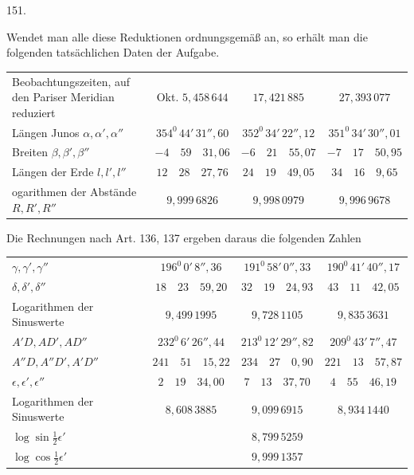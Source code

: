 \par{}\medskip
\hypertarget{native-202-article151}{}
\begin{center}151.\end{center}
Wendet man alle diese Reduktionen ordnungsgemäß an, so erhält man die folgenden tatsächlichen Daten der Aufgabe.
\begin{center}
\footnotesize\setlength{\tabcolsep}{3pt}\renewcommand{\arraystretch}{1.3}
\begin{tabular}{@{}p{12em}|c|c|c@{}}
{\raggedright Beobachtungszeiten, auf den Pariser Meridian reduziert\par} & Okt. $5{,}458\,644$ & $17{,}421\,885$ & $27{,}393\,077$\\
{\raggedright Längen Junos $\alpha,\alpha',\alpha''$\par} & $354^0\,44'\,31''{,}60$ & $352^0\,34'\,22''{,}12$ & $351^0\,34'\,30''{,}01$\\
{\raggedright Breiten $\beta,\beta',\beta''$\par} & $-4\quad59\quad31{,}06$ & $-6\quad21\quad55{,}07$ & $-7\quad17\quad50{,}95$\\
{\raggedright Längen der Erde $l,l',l''$\par} & $12\quad28\quad27{,}76$ & $24\quad19\quad49{,}05$ & $34\quad16\quad9{,}65$\\
{\raggedright ogarithmen der Abstände $R,R',R''$\par} & $9{,}999\,6826$ & $9{,}998\,0979$ & $9{,}996\,9678$\\
\end{tabular}
\end{center}

Die Rechnungen nach Art. 136, 137 ergeben daraus die folgenden Zahlen
\begin{center}
\footnotesize\setlength{\tabcolsep}{4pt}\renewcommand{\arraystretch}{1.3}
\begin{tabular}{@{}l|c|c|c@{}}
$\gamma,\gamma',\gamma''$ & $196^0\,0'\,8''{,}36$ & $191^0\,58'\,0''{,}33$ & $190^0\,41'\,40''{,}17$\\
$\delta,\delta',\delta''$ & $18\quad23\quad59{,}20$ & $32\quad19\quad24{,}93$ & $43\quad11\quad42{,}05$\\
Logarithmen der Sinuswerte & $9{,}499\,1995$ & $9{,}728\,1105$ & $9{,}835\,3631$\\
$A'D,AD',AD''$ & $232^0\,6'\,26''{,}44$ & $213^0\,12'\,29''{,}82$ & $209^0\,43'\,7''{,}47$\\
$A''D,A''D',A'D''$ & $241\quad51\quad15{,}22$ & $234\quad27\quad0{,}90$ & $221\quad13\quad57{,}87$\\
$\epsilon,\epsilon',\epsilon''$ & $2\quad19\quad34{,}00$ & $7\quad13\quad37{,}70$ & $4\quad55\quad46{,}19$\\
Logarithmen der Sinuswerte & $8{,}608\,3885$ & $9{,}099\,6915$ & $8{,}934\,1440$\\
$\log\sin\tfrac12\epsilon'$ & & $8{,}799\,5259$ & \\
$\log\cos\tfrac12\epsilon'$ & & $9{,}999\,1357$ & \\
\end{tabular}
\end{center}

